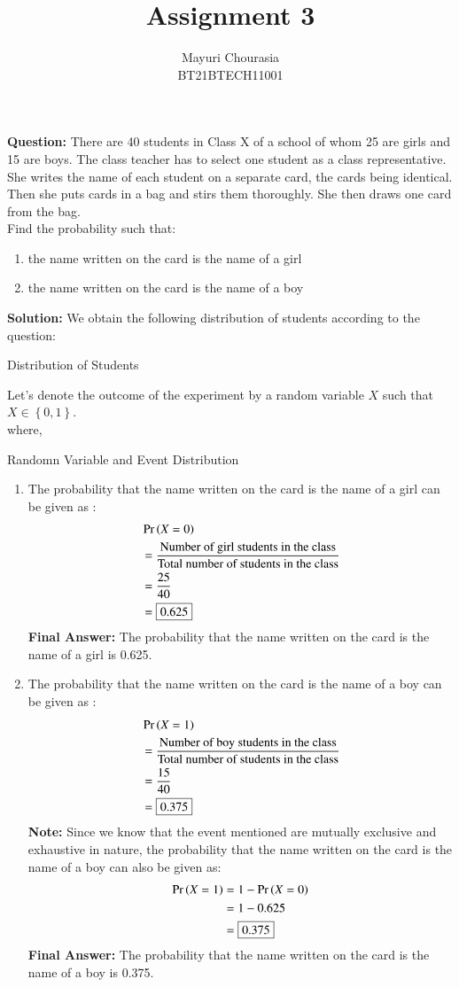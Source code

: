 \documentclass[journal,12pt,twocolumn]{IEEEtran}
\title{Assignment 3}
\author{Mayuri Chourasia\\BT21BTECH11001}
\date{}
\providecommand{\pr}[1]{\ensuremath{\Pr\left(#1\right)}}
\providecommand{\cbrak}[1]{\ensuremath{\left\{#1\right\}}}
\newcommand{\question}{\noindent \textbf{Question: }}
\newcommand{\solution}{\noindent \textbf{Solution: }}
\newcommand{\note}{\noindent \textbf{Note: }}
\newcommand{\final}{\noindent \textbf{Final Answer: }}
\begin{document}
\maketitle
\question There are 40 students in Class X of a school of whom 25 are girls and 15
are boys. The class teacher has to select one student as a class representative. She
writes the name of each student on a separate card, the cards being identical. Then
she puts cards in a bag and stirs them thoroughly. She then draws one card from the
bag.\\
Find the probability such that:
\begin{enumerate}[label=(\roman{enumi})]
	\item the name written on the card is the name of a girl
	\item the name written on the card is the name of a boy
\end{enumerate}
\solution We obtain the following distribution of students according to the question:
\begin{table}[H]

	\caption{Distribution of Students}
	\label{tab1}
\end{table}
Let's denote the outcome of the experiment by a random variable $X$ such that $X\in \cbrak{0 , 1}$. \\
where,
\begin{table}[H]

	\caption{Randomn Variable and Event Distribution}
	\label{tab2}
\end{table}
\begin{enumerate}[label=(\roman{enumi})]
\item The probability that the name written on the card is the name of a girl can be given as :
\begin{align}
	 &\pr{X=0}\\
	 &=\frac{\text{Number of girl students in the class}}{\text{Total number of students in the class}}\\
	&=\frac{25}{40}\\
	&=\fbox{0.625}
\end{align}
\final The probability that the name written on the card is the name of a girl is 0.625.
\item The probability that the name written on the card is the name of a boy can be given as :
\begin{align}
	 &\pr{X=1}\\
	 &=\frac{\text{Number of boy students in the class}}{\text{Total number of students in the class}}\\
	&=\frac{15}{40}\\
	&=\fbox{0.375}
\end{align}
\note Since we know that the event mentioned are mutually exclusive and exhaustive in nature, the probability that the name written on the card is the name of a boy can also be given as:
\begin{align}
	\pr{X=1}&=1-\pr{X=0}\\
	&=1-0.625\\
	&=\fbox{0.375}
\end{align}
\final The probability that the name written on the card is the name of a boy is 0.375.
\end{enumerate}
\end{document}
